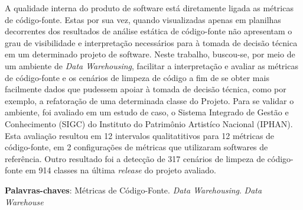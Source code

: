 \begin{resumo}

	A qualidade interna do produto de software está diretamente ligada as métricas de código-fonte. Estas por sua vez, quando visualizadas apenas em planilhas decorrentes dos resultados de análise estática de código-fonte não apresentam o grau de visibilidade e interpretação necessários para à tomada de decisão técnica em um determinado projeto de software. Neste trabalho, buscou-se, por meio de um ambiente de \textit{Data Warehousing}, facilitar a interpretação e avaliar as métricas de código-fonte e os cenários de limpeza de código a fim de se obter mais facilmente dados que pudessem apoiar à tomada de decisão técnica, como por exemplo, a refatoração de uma determinada classe do Projeto. Para se validar o ambiente, foi avaliado em um estudo de caso, o Sistema Integrado de Gestão e Conhecimento (SIGC) do Instituto do Patrimônio Artistíco Nacional (IPHAN). Esta avaliação resultou em 12 intervalos qualitatitivos para 12 métricas de código-fonte, em 2 configurações de métricas que utilizaram softwares de referência. Outro resultado foi a detecção de 317 cenários de limpeza de código-fonte em 914 classes na última \textit{release} do projeto avaliado.

 \vspace{\onelineskip}
    
 \noindent
 \textbf{Palavras-chaves}: Métricas de Código-Fonte. \textit{Data Warehousing}. \textit{Data Warehouse}
\end{resumo}
